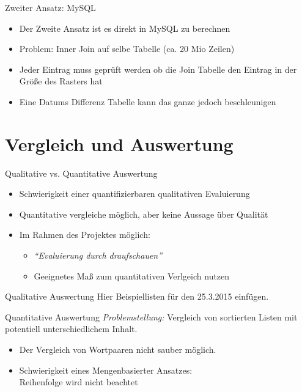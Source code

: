 \documentclass{beamer}
\begin{document}
\begin{frame}{Zweiter Ansatz: MySQL}
	\begin{itemize}
		\item Der Zweite Ansatz ist es direkt in MySQL zu berechnen
		\item Problem: Inner Join auf selbe Tabelle (ca. 20 Mio Zeilen)
		\item Jeder Eintrag muss geprüft werden ob die Join Tabelle den Eintrag in der Größe des Rasters hat
		\item Eine Datums Differenz Tabelle kann das ganze jedoch beschleunigen

	\end{itemize}
\end{frame}

\section{Vergleich und Auswertung}
\begin{frame} \sectionpage \end{frame}
\begin{frame}{Qualitative vs. Quantitative Auswertung}
	\begin{itemize}
		\item{Schwierigkeit einer quantifizierbaren qualitativen Evaluierung}
		\item{Quantitative vergleiche m\"oglich, aber keine Aussage \"uber Qualit\"at}
		\item{Im Rahmen des Projektes m\"oglich:
			\begin{itemize}
				\item{\emph{``Evaluierung durch draufschauen''}}
				\item{Geeignetes Maß zum quantitativen Verlgeich nutzen}
			\end{itemize}
		}
	\end{itemize}
\end{frame}

\begin{frame}{Qualitative Auswertung}
Hier Beispiellisten f\"ur den 25.3.2015 einf\"ugen.
\end{frame}

\begin{frame}{Quantitative Auswertung}
	\emph{Problemstellung: }Vergleich von sortierten Listen mit potentiell unterschiedlichem Inhalt.
	\begin{itemize}
		\item{Der Vergleich von Wortpaaren nicht sauber m\"oglich.}
		\item{Schwierigkeit eines Mengenbasierter Ansatzes:\\Reihenfolge wird nicht beachtet }
	\end{itemize}	
\end{frame}
\end{document}
